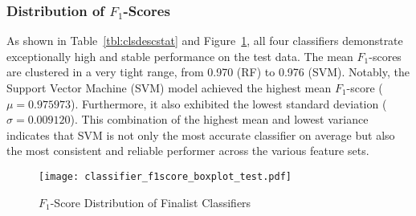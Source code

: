 \subsubsection{Distribution of \(F_1\)-Scores}
As shown in Table~\ref{tbl:clsdescstat} and Figure~\ref{fig:clscoredist}, all four classifiers demonstrate exceptionally high and stable performance on the test data. The mean \(F_1\)-scores are clustered in a very tight range, from 0.970 (RF) to 0.976 (SVM). Notably, the Support Vector Machine (SVM) model achieved the highest mean \(F_1\)-score (\(\mu = 0.975973\)). Furthermore, it also exhibited the lowest standard deviation (\(\sigma = 0.009120\)). This combination of the highest mean and lowest variance indicates that SVM is not only the most accurate classifier on average but also the most consistent and reliable performer across the various feature sets.
\begin{figure}[tb]
    \captionsetup{skip=5pt}
    \centering
    \texttt{[image: classifier\_f1score\_boxplot\_test.pdf]}
    \caption{\(F_1\)-Score Distribution of Finalist Classifiers}
    \label{fig:clscoredist}
\end{figure}
\begin{table}[tb]
    \captionsetup{skip=5pt}
    \caption{Model Specifications and Performance}
    \label{tbl:clsdescstat}
    \centering
\end{table}

